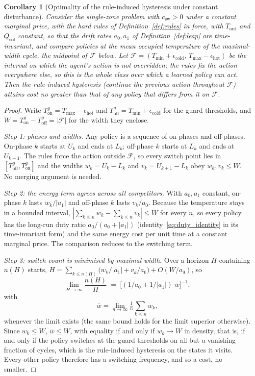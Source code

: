 \documentclass[pdflatex,sn-mathphys-num,iicol]{sn-jnl}
\theoremstyle{thmstyleone}\newtheorem{proposition}{Proposition}\newtheorem{corollary}{Corollary}
\theoremstyle{thmstyletwo}\newtheorem{remark}{Remark}\newtheorem{observation}{Observation}
\theoremstyle{thmstylethree}\newtheorem{definition}{Definition}
\newcommand{\Tmin}{T_{\min}}
\newcommand{\Tmax}{T_{\max}}
\newcommand{\Tout}{T_{\mathrm{out}}}
\newcommand{\csw}{c_{\mathrm{sw}}}
\begin{document}
\begin{corollary}[Optimality of the rule-induced hysteresis under constant disturbance]
\label{cor:rules_sufficient}
Consider the single-zone problem with $\csw>0$ under a constant marginal price, with the hard rules of Definition~\ref{def:rules} in force, \emph{with $\Tout$ and $Q_{\mathrm{sol}}$ constant}, so that the drift rates $a_0,a_1$ of Definition~\ref{def:leap} are time-invariant, and compare policies \emph{at the mean occupied temperature of the maximal-width cycle}, the midpoint of $\mathcal{F}$ below. Let $\mathcal{F}=(\Tmin+\epsilon_{\mathrm{cold}},\,\Tmax-\epsilon_{\mathrm{hot}})$ be the interval on which the agent's action is not overridden: the rules fix the action everywhere else, so this is the whole class over which a learned policy can act. Then the rule-induced hysteresis (continue the previous action throughout $\mathcal{F}$) attains cost no greater than that of any policy that differs from it on $\mathcal{F}$.
\end{corollary}
\begin{proof}
Write $T_{\mathrm{on}}^{g}=\Tmax-\epsilon_{\mathrm{hot}}$ and $T_{\mathrm{off}}^{g}=\Tmin+\epsilon_{\mathrm{cold}}$ for the guard thresholds, and $W=T_{\mathrm{on}}^{g}-T_{\mathrm{off}}^{g}=|\mathcal{F}|$ for the width they enclose.

\emph{Step 1: phases and widths.} Any policy is a sequence of on-phases and off-phases. On-phase $k$ starts at $U_k$ and ends at $L_k$; off-phase $k$ starts at $L_k$ and ends at $U_{k+1}$. The rules force the action outside $\mathcal{F}$, so every switch point lies in $[T_{\mathrm{off}}^{g},T_{\mathrm{on}}^{g}]$ and the widths $w_k=U_k-L_k$ and $v_k=U_{k+1}-L_k$ obey $w_k,v_k\le W$. No merging argument is needed.

\emph{Step 2: the energy term agrees across all competitors.} With $a_0,a_1$ constant, on-phase $k$ lasts $w_k/|a_1|$ and off-phase $k$ lasts $v_k/a_0$. Because the temperature stays in a bounded interval, $|\sum_{k\le n}w_k-\sum_{k\le n}v_k|\le W$ for every $n$, so every policy has the long-run duty ratio $a_0/(a_0+|a_1|)$ (identity~\eqref{eq:duty_identity} in its time-invariant form) and the same energy cost per unit time at a constant marginal price. The comparison reduces to the switching term.

\emph{Step 3: switch count is minimised by maximal width.} Over a horizon $H$ containing $n(H)$ starts, $H=\sum_{k\le n(H)}\bigl(w_k/|a_1|+v_k/a_0\bigr)+O(W/a_0)$, so
\[
\lim_{H\to\infty}\frac{n(H)}{H}
   \;=\;\Big[(1/a_0+1/|a_1|)\;\overline{w}\Big]^{-1},
\] with
\[
\overline{w}=\lim_{n\to\infty}\tfrac1n\sum_{k\le n}w_k ,
\] whenever the limit exists (the same bound holds for the limit superior otherwise). Since $w_k\le W$, $\overline{w}\le W$, with equality if and only if $w_k\to W$ in density, that is, if and only if the policy switches at the guard thresholds on all but a vanishing fraction of cycles, which is the rule-induced hysteresis on the states it visits. Every other policy therefore has a switching frequency, and so a cost, no smaller.
\end{proof}
\end{document}
